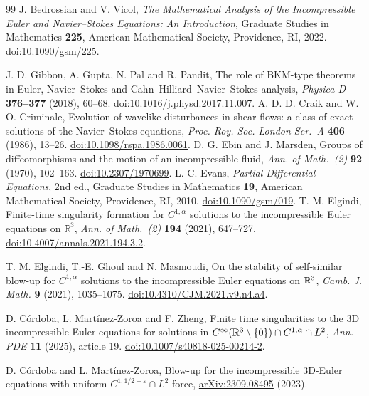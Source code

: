 \begin{thebibliography}{99}
 J. Bedrossian and V. Vicol,
\emph{The Mathematical Analysis of the Incompressible Euler and
Navier--Stokes Equations: An Introduction}, Graduate Studies in
Mathematics \textbf{225}, American Mathematical Society, Providence, RI, 2022.
\href{https://doi.org/10.1090/gsm/225}{doi:10.1090/gsm/225}.

 J. D. Gibbon, A. Gupta, N. Pal and R. Pandit,
The role of BKM-type theorems in Euler, Navier--Stokes and
Cahn--Hilliard--Navier--Stokes analysis, \emph{Physica D}
\textbf{376--377} (2018), 60--68.
\href{https://doi.org/10.1016/j.physd.2017.11.007}{doi:10.1016/j.physd.2017.11.007}.
 A. D. D. Craik and W. O. Criminale, Evolution of
wavelike disturbances in shear flows: a class of exact solutions of the
Navier--Stokes equations, \emph{Proc. Roy. Soc. London Ser.~A}
\textbf{406} (1986), 13--26.
\href{https://doi.org/10.1098/rspa.1986.0061}{doi:10.1098/rspa.1986.0061}.
 D. G. Ebin and J. Marsden, Groups of diffeomorphisms
and the motion of an incompressible fluid, \emph{Ann. of Math.~(2)} \textbf{92}
(1970), 102--163.
\href{https://doi.org/10.2307/1970699}{doi:10.2307/1970699}.
 L. C. Evans, \emph{Partial Differential Equations}, 2nd ed.,
Graduate Studies in Mathematics \textbf{19}, American Mathematical Society,
Providence, RI, 2010.
\href{https://doi.org/10.1090/gsm/019}{doi:10.1090/gsm/019}.
 T. M. Elgindi,
Finite-time singularity formation for $C^{1,\alpha}$ solutions to the
incompressible Euler equations on $\mathbb R^3$,
\emph{Ann. of Math.\ (2)} \textbf{194} (2021), 647--727.
\href{https://doi.org/10.4007/annals.2021.194.3.2}{doi:10.4007/annals.2021.194.3.2}.

T. M. Elgindi, T.-E. Ghoul and N. Masmoudi,
On the stability of self-similar blow-up for $C^{1,\alpha}$ solutions to the
incompressible Euler equations on $\mathbb R^3$,
\emph{Camb. J. Math.} \textbf{9} (2021), 1035--1075.
\href{https://doi.org/10.4310/CJM.2021.v9.n4.a4}{doi:10.4310/CJM.2021.v9.n4.a4}.

 D. C\'ordoba, L. Mart\'inez-Zoroa and F. Zheng,
Finite time singularities to the 3D incompressible Euler equations
for solutions in $C^\infty(\mathbb R^3\setminus\{0\})\cap C^{1,\alpha}\cap L^2$,
\emph{Ann. PDE} \textbf{11} (2025), article 19.
\href{https://doi.org/10.1007/s40818-025-00214-2}{doi:10.1007/s40818-025-00214-2}.

 D. C\'ordoba and L. Mart\'inez-Zoroa,
Blow-up for the incompressible 3D-Euler equations with uniform
$C^{1,1/2-\varepsilon}\cap L^2$ force,
\href{https://arxiv.org/abs/2309.08495}{arXiv:2309.08495} (2023).


\end{thebibliography}
